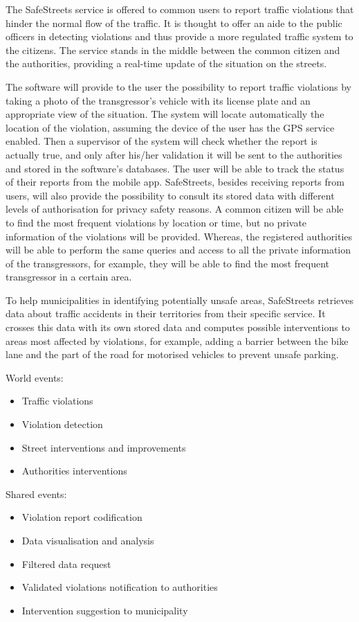 The SafeStreets service is offered to common users to report traffic violations that hinder the normal flow of the traffic. It is thought to offer an aide to the public officers in detecting violations and thus provide a more regulated traffic system to the citizens. The service stands in the middle between the common citizen and the authorities, providing a real-time update of the situation on the streets.

The software will provide to the user the possibility to report traffic violations by taking a photo of the transgressor's vehicle with its license plate and an appropriate view of the situation. The system will locate automatically the location of the violation, assuming the device of the user has the GPS service enabled. Then a supervisor of the system will check whether the report is actually true, and only after his/her validation it will be sent to the authorities and stored in the software's databases. The user will be able to track the status of their reports from the mobile app. SafeStreets, besides receiving reports from users, will also provide the possibility to consult its stored data with different levels of authorisation for privacy safety reasons. A common citizen will be able to find the most frequent violations by location or time, but no private information of the violations will be provided. Whereas, the registered authorities will be able to perform the same queries and access to all the private information of the transgressors, for example, they will be able to find the most frequent transgressor in a certain area.

To help municipalities in identifying potentially unsafe areas, SafeStreets retrieves data about traffic accidents in their territories from their specific service. It crosses this data with its own stored data and computes possible interventions to areas most affected by violations, for example, adding a barrier between the bike lane and the part of the road for motorised vehicles to prevent unsafe parking.


World events:
\begin{itemize}
    \item Traffic violations
    \item Violation detection
    \item Street interventions and improvements
    \item Authorities interventions
\end{itemize}

Shared events:
\begin{itemize}
    \item Violation report codification
    \item Data visualisation and analysis
    \item Filtered data request
    \item Validated violations notification to authorities
    \item Intervention suggestion to municipality
\end{itemize}

